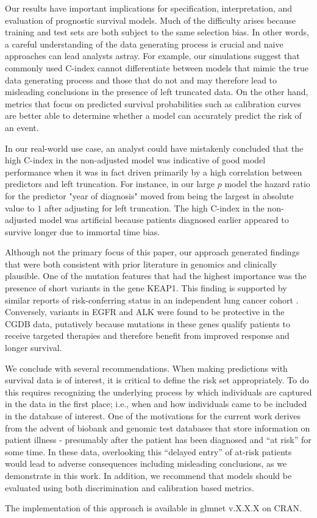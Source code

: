 \documentclass[11pt,final,fleqn]{article}\usepackage[]{graphicx}\usepackage[]{color}
\theoremstyle{plain}
\newcommand{\pkg}[1]{{\fontseries{b}\selectfont #1}}
\begin{document}
Our results have important implications for specification, interpretation, and evaluation of prognostic survival models. Much of the difficulty arises because training and test sets are both subject to the same selection bias. In other words, a careful understanding of the data generating process is crucial and naive approaches can lead analysts astray. For example, our simulations suggest that commonly used C-index cannot differentiate between models that mimic the true data generating process and those that do not and may therefore lead to misleading conclusions in the presence of left truncated data. On the other hand, metrics that focus on predicted survival probabilities such as calibration curves are better able to determine whether a model can accurately predict the risk of an event.  

In our real-world use case, an analyst could have mistakenly concluded that the high C-index in the non-adjusted model was indicative of good model performance when it was in fact driven primarily by a high correlation between predictors and left truncation. For instance, in our large $p$ model the hazard ratio for the predictor "year of diagnosis" moved from being the largest in absolute value to $1$ after adjusting for left truncation. The high C-index in the non-adjusted model was artificial because patients diagnosed earlier appeared to survive longer due to immortal time bias.

Although not the primary focus of this paper, our approach generated findings that were both consistent with prior literature in genomics and clinically plausible. One of the mutation features that had the highest importance was the presence of short variants in the gene KEAP1. This finding is supported by similar reports of risk-conferring status in an independent lung cancer cohort \citep{shen_harnessing_2019}. Conversely, variants in EGFR and ALK were found to be protective in the CGDB data, putatively because mutations in these genes qualify patients to receive targeted therapies and therefore benefit from improved response and longer survival.

We conclude with several recommendations. When making predictions with survival data is of interest, it is critical to define the risk set appropriately. To do this requires recognizing the underlying process by which individuals are captured in the data in the first place; i.e., when and how individuals came to be included in the database of interest. One of the motivations for the current work derives from the advent of biobank and genomic test databases that store information on patient illness - presumably after the patient has been diagnosed and ``at risk'' for some time. In these data, overlooking this ``delayed entry'' of at-risk patients would lead to adverse consequences including misleading conclusions, as we demonstrate in this work. In addition, we recommend that models should be evaluated using both discrimination and calibration based metrics.

The implementation of this approach is available in \pkg{glmnet} v.X.X.X on CRAN.


\end{document}
